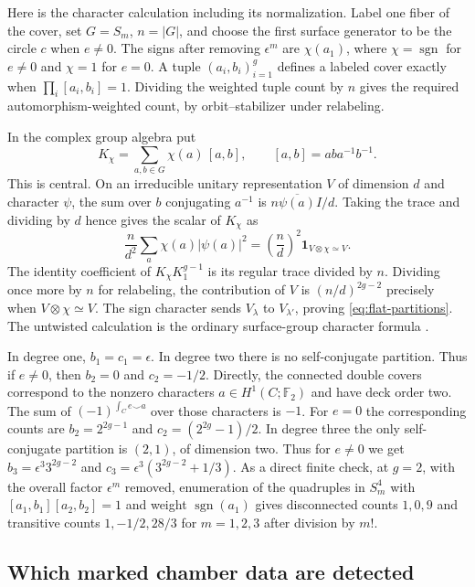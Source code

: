 Here is the character calculation including its normalization. Label one fiber of the cover, set \(G=S_m\), \(n=|G|\), and choose the first surface generator to be the circle \(c\) when \(e\ne0\). The signs after removing \(\epsilon^m\) are \(\chi(a_1)\), where \(\chi=\operatorname{sgn}\) for \(e\ne0\) and \(\chi=1\) for \(e=0\). A tuple \((a_i,b_i)_{i=1}^g\) defines a labeled cover exactly when \(\prod_i[a_i,b_i]=1\). Dividing the weighted tuple count by \(n\) gives the required automorphism-weighted count, by orbit--stabilizer under relabeling.

In the complex group algebra put
\[K_\chi=\sum_{a,b\in G}\chi(a)\,[a,b],
  \qquad [a,b]=aba^{-1}b^{-1}.\]
This is central. On an irreducible unitary representation \(V\) of dimension \(d\) and character \(\psi\), the sum over \(b\) conjugating \(a^{-1}\) is \(n\overline{\psi(a)}I/d\). Taking the trace and dividing by \(d\) hence gives the scalar of \(K_\chi\) as
\[\frac n{d^2}\sum_a\chi(a)|\psi(a)|^2
   =\left(\frac nd\right)^2
       \mathbf 1_{V\otimes\chi\simeq V}.\]
The identity coefficient of \(K_\chi K_1^{g-1}\) is its regular trace divided by \(n\). Dividing once more by \(n\) for relabeling, the contribution of \(V\) is \((n/d)^{2g-2}\) precisely when \(V\otimes\chi\simeq V\). The sign character sends \(V_\lambda\) to \(V_{\lambda'}\), proving \eqref{eq:flat-partitions}. The untwisted calculation is the ordinary surface-group character formula \cite{med}.

In degree one, \(b_1=c_1=\epsilon\). In degree two there is no self-conjugate partition. Thus if \(e\ne0\), then \(b_2=0\) and \(c_2=-1/2\). Directly, the connected double covers correspond to the nonzero characters \(a\in H^1(C;\mathbb F_2)\) and have deck order two. The sum of \((-1)^{\int_C e\smile a}\) over those characters is \(-1\). For \(e=0\) the corresponding counts are \(b_2=2^{2g-1}\) and \(c_2=(2^{2g}-1)/2\). In degree three the only self-conjugate partition is \((2,1)\), of dimension two. Thus for \(e\ne0\) we get \(b_3=\epsilon^3 3^{2g-2}\) and \(c_3=\epsilon^3(3^{2g-2}+1/3)\). As a direct finite check, at \(g=2\), with the overall factor \(\epsilon^m\) removed, enumeration of the quadruples in \(S_m^4\) with \([a_1,b_1][a_2,b_2]=1\) and weight \(\operatorname{sgn}(a_1)\) gives disconnected counts \(1,0,9\) and transitive counts \(1,-1/2,28/3\) for \(m=1,2,3\) after division by \(m!\).

\subsection{Which marked chamber data are detected}

